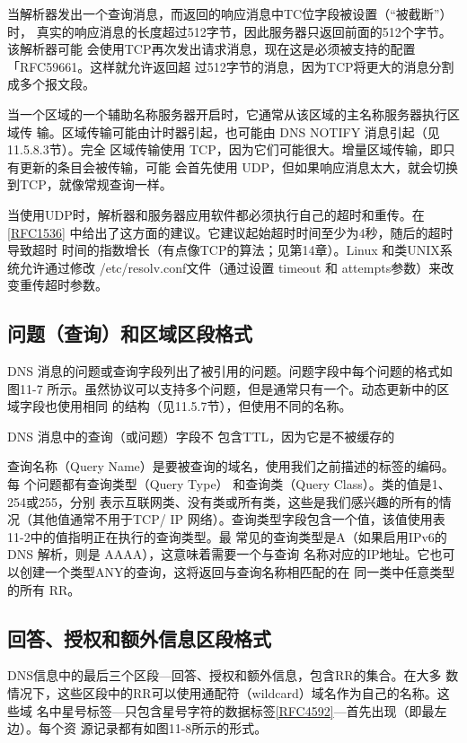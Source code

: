 当解析器发出一个查询消息，而返回的响应消息中TC位字段被设置（“被截断”）时，
真实的响应消息的长度超过512字节，因此服务器只返回前面的512个字节。该解析器可能
会使用TCP再次发出请求消息，现在这是必须被支持的配置「RFC59661。这样就允许返回超
过512字节的消息，因为TCP将更大的消息分割成多个报文段。

当一个区域的一个辅助名称服务器开启时，它通常从该区域的主名称服务器执行区域传
输。区域传输可能由计时器引起，也可能由 DNS NOTIFY 消息引起（见11.5.8.3节）。完全
区域传输使用 TCP，因为它们可能很大。增量区域传输，即只有更新的条目会被传输，可能
会首先使用 UDP，但如果响应消息太大，就会切换到TCP，就像常规查询一样。

当使用UDP时，解析器和服务器应用软件都必须执行自己的超时和重传。在
\href{https://www.rfc-editor.org/rfc/rfc1536}{[RFC1536]} 中给出了这方面的建议。它建议起始超时时间至少为4秒，随后的超时导致超时
时间的指数增长（有点像TCP的算法；见第14章）。Linux 和类UNIX系统允许通过修改
/etc/resolv.conf文件（通过设置 timeout 和 attempts参数）来改变重传超时参数。

\subsection{问题（查询）和区域区段格式}

DNS 消息的问题或查询字段列出了被引用的问题。问题字段中每个问题的格式如图11-7
所示。虽然协议可以支持多个问题，但是通常只有一个。动态更新中的区域字段也使用相同
的结构（见11.5.7节），但使用不同的名称。

DNS 消息中的查询（或问题）字段不
包含TTL，因为它是不被缓存的

查询名称（Query Name）是要被查询的域名，使用我们之前描述的标签的编码。每
个问题都有查询类型（Query Type） 和查询类（Query Class）。类的值是1、254或255，分别
表示互联网类、没有类或所有类，这些是我们感兴趣的所有的情况（其他值通常不用于TCP/
IP 网络）。查询类型字段包含一个值，该值使用表11-2中的值指明正在执行的查询类型。最
常见的查询类型是A（如果启用IPv6的 DNS 解析，则是 AAAA），这意味着需要一个与查询
名称对应的IP地址。它也可以创建一个类型ANY的查询，这将返回与查询名称相匹配的在
同一类中任意类型的所有 RR。


\subsection{回答、授权和额外信息区段格式}

DNS信息中的最后三个区段—回答、授权和额外信息，包含RR的集合。在大多
数情况下，这些区段中的RR可以使用通配符（wildcard）域名作为自己的名称。这些域
名中星号标签—只包含星号字符的数据标签\href{https://www.rfc-editor.org/rfc/rfc4592}{[RFC4592]}—首先出现（即最左边）。每个资
源记录都有如图11-8所示的形式。

